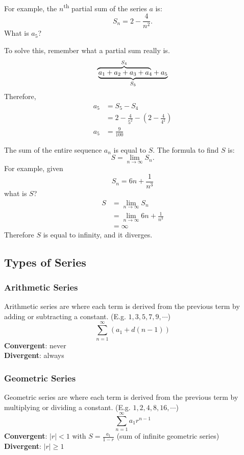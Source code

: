 \documentclass[12pt]{article}
\begin{document}
\noindent For example, the $n$\textsuperscript{th} partial sum of the series $a$ is:
\[ S_n = 2 - \frac{4}{n^2}. \]
What is $a_5$?

\noindent To solve this, remember what a partial sum really is.
\[ \rlap{$\overbrace{\phantom{a_1 + a_2 + a_3 + a_4}}^{S_4}$} \underbrace{a_1 + a_2 + a_3 + a_4 + a_5}_{S_5} \]
Therefore,
\begin{align*}
    a_5 & = S_5 - S_4                                            \\
        & = 2 - \frac{4}{5^2} - \left( 2 - \frac{4}{4^2} \right) \\[6pt]
    a_5 & = \frac{9}{100}
\end{align*}

The sum of the entire sequence $a_n$ is equal to $S$. The formula to find $S$ is:
\[ S = \lim_{n \to \infty} S_n. \]
For example, given
\[ S_n = 6n + \frac{1}{n^3} \]
what is $S$?
\begin{align*}
    S & = \lim_{n \to \infty} S_n                \\
      & = \lim_{n \to \infty} 6n + \frac{1}{n^3} \\[6pt]
      & = \infty
\end{align*}
Therefore $S$ is equal to infinity, and it diverges.

\subsection{Types of Series}
\subsubsection{Arithmetic Series}
Arithmetic series are where each term is derived from the previous term by adding or subtracting a constant. (E.g. $1, 3, 5, 7, 9, \cdots$)
\[ \sum_{n=1}^\infty (a_1 + d(n-1)) \]
\textbf{Convergent}: never
\\ \textbf{Divergent}: always

\subsubsection{Geometric Series}
Geometric series are where each term is derived from the previous term by multiplying or dividing a constant. (E.g. $1, 2, 4, 8, 16, \cdots$)
\[ \sum_{n=1}^\infty a_1r^{n-1} \]
\textbf{Convergent}: $|r| < 1$ with $S = \frac{a_1}{1-r}$ (sum of infinite geometric series)
\\ \textbf{Divergent}: $|r| \ge 1$
\end{document}
